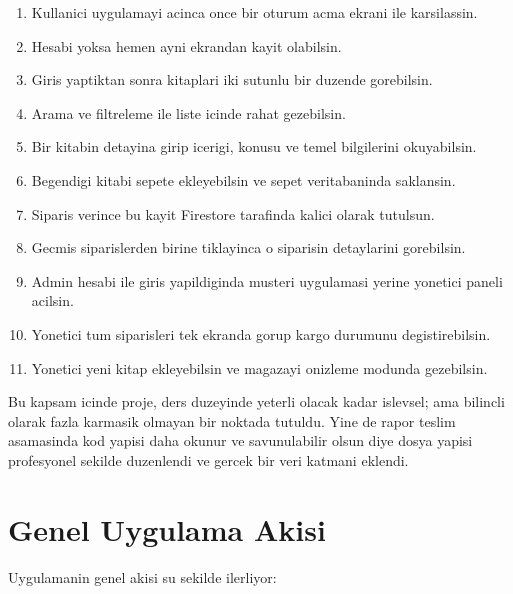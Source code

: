 \documentclass[12pt,a4paper]{article}
\begin{document}
\begin{enumerate}
  \item Kullanici uygulamayi acinca once bir oturum acma ekrani ile karsilassin.
  \item Hesabi yoksa hemen ayni ekrandan kayit olabilsin.
  \item Giris yaptiktan sonra kitaplari iki sutunlu bir duzende gorebilsin.
  \item Arama ve filtreleme ile liste icinde rahat gezebilsin.
  \item Bir kitabin detayina girip icerigi, konusu ve temel bilgilerini okuyabilsin.
  \item Begendigi kitabi sepete ekleyebilsin ve sepet veritabaninda saklansin.
  \item Siparis verince bu kayit Firestore tarafinda kalici olarak tutulsun.
  \item Gecmis siparislerden birine tiklayinca o siparisin detaylarini gorebilsin.
  \item Admin hesabi ile giris yapildiginda musteri uygulamasi yerine yonetici paneli acilsin.
  \item Yonetici tum siparisleri tek ekranda gorup kargo durumunu degistirebilsin.
  \item Yonetici yeni kitap ekleyebilsin ve magazayi onizleme modunda gezebilsin.
\end{enumerate}

Bu kapsam icinde proje, ders duzeyinde yeterli olacak kadar islevsel; ama bilincli olarak fazla karmasik olmayan bir noktada tutuldu. Yine de rapor teslim asamasinda kod yapisi daha okunur ve savunulabilir olsun diye dosya yapisi profesyonel sekilde duzenlendi ve gercek bir veri katmani eklendi.

\section{Genel Uygulama Akisi}

Uygulamanin genel akisi su sekilde ilerliyor:
\end{document}
